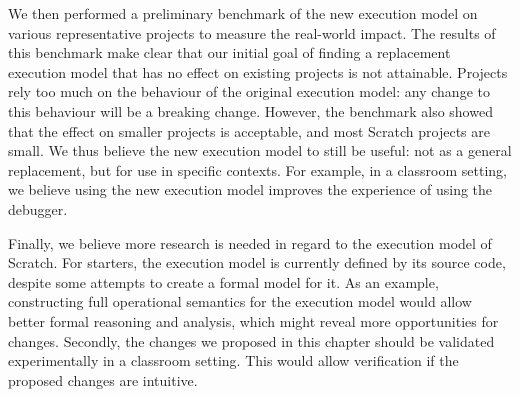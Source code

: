 \documentclass[main]{subfiles}
\begin{document}
We then performed a preliminary benchmark of the new execution model on various representative projects to measure the real-world impact.
The results of this benchmark make clear that our initial goal of finding a replacement execution model that has no effect on existing projects is not attainable.
Projects rely too much on the behaviour of the original execution model: any change to this behaviour will be a breaking change.
However, the benchmark also showed that the effect on smaller projects is acceptable, and most Scratch projects are small.
We thus believe the new execution model to still be useful: not as a general replacement, but for use in specific contexts.
For example, in a classroom setting, we believe using the new execution model improves the experience of using the debugger.

Finally, we believe more research is needed in regard to the execution model of Scratch.
For starters, the execution model is currently defined by its source code, despite some attempts to create a formal model for it.
As an example, constructing full operational semantics for the execution model would allow better formal reasoning and analysis, which might reveal more opportunities for changes.
Secondly, the changes we proposed in this chapter should be validated experimentally in a classroom setting.
This would allow verification if the proposed changes are intuitive.
\end{document}

